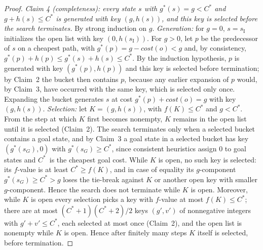 \documentclass[letterpaper]{article}
\newcommand{\sinit}{\ensuremath{s_{\mathrm{I}}}}
\newcommand{\cost}{\ensuremath{\mathit{cost}}}
\newcommand{\gstar}{\ensuremath{g^{*}}}
\newcommand{\copt}{\ensuremath{C^{*}}}
\theoremstyle{plain}
\theoremstyle{definition}
\theoremstyle{remark}
\begin{document}
\begin{proof}
\emph{Claim 4 (completeness): every state $s$ with
$\gstar(s) = g < \copt$ and $g + h(s) \leq \copt$ is generated with key
$(g, h(s))$, and this key is selected before the search terminates.}
By strong induction on $g$. \emph{Generation:} for $g = 0$, $s = \sinit$
initializes the open list with key $(0, h(\sinit))$. For $g > 0$, let
$p$ be the predecessor of $s$ on a cheapest path, with
$\gstar(p) = g - \cost(o) < g$ and, by consistency,
$\gstar(p) + h(p) \leq \gstar(s) + h(s) \leq \copt$. By the induction
hypothesis, $p$ is generated with key $(\gstar(p), h(p))$ and this key
is selected before termination; by Claim~2 the bucket then contains
$p$, because any earlier expansion of $p$ would, by Claim~3, have
occurred with the same key, which is selected only once. Expanding the
bucket generates $s$ at cost $\gstar(p) + \cost(o) = g$ with key
$(g, h(s))$. \emph{Selection:} let $K = (g, h(s))$, with
$f(K) \leq \copt$ and $g < \copt$. From the step at which $K$ first
becomes nonempty, $K$ remains in the open list until it is selected
(Claim~2). The search terminates only when a selected bucket contains a
goal state, and by Claim~3 a goal state in a selected bucket has key
$(\gstar(s_G), 0)$ with $\gstar(s_G) \geq \copt$, since consistent
heuristics assign $0$ to goal states and \copt\ is the cheapest goal
cost. While $K$ is open, no such key is selected: its $f$-value is at
least $\copt \geq f(K)$, and in case of equality its $g$-component
$\gstar(s_G) \geq \copt > g$ loses the tie-break against $K$ or another
open key with smaller $g$-component. Hence the search does not
terminate while $K$ is open. Moreover, while $K$ is open every
selection picks a key with $f$-value at most $f(K) \leq \copt$; there
are at most $(\copt + 1)(\copt + 2)/2$ keys $(g', v')$ of nonnegative
integers with $g' + v' \leq \copt$, each selected at most once
(Claim~2), and the open list is nonempty while $K$ is open. Hence after
finitely many steps $K$ itself is selected, before termination.


\end{proof}
\end{document}
